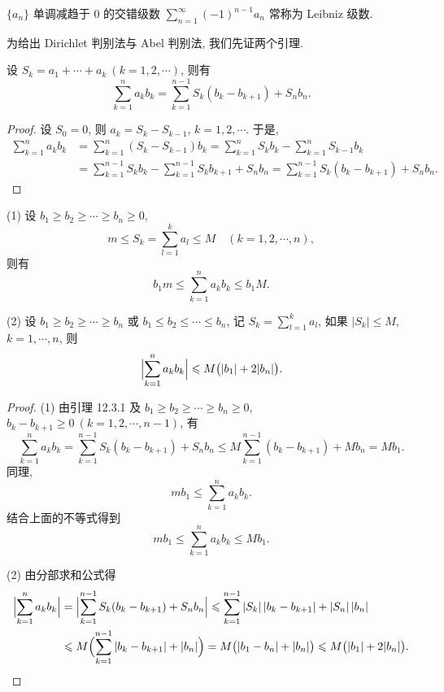 $\{a_{n}\}$ 单调减趋于 $0$ 的交错级数 $\sum_{n=1}^{\infty}(-1)^{n-1}a_{n}$ 常称为 Leibniz 级数.

为给出 Dirichlet 判别法与 Abel 判别法, 我们先证两个引理.

\begin{lemma}[分部求和法]\label{lem:12.3.1}
设 $S_{k}=a_{1}+\cdots+a_{k}\ (k=1,2,\cdots)$, 则有
\[
  \sum_{k=1}^{n}a_{k}b_{k}=\sum_{k=1}^{n-1}S_{k}(b_{k}-b_{k+1})+S_{n}b_{n}.
\]
\end{lemma}

\begin{proof}
设 $S_{0}=0$, 则 $a_{k}=S_{k}-S_{k-1}$, $k=1,2,\cdots$. 于是,
\[
\begin{aligned}
  \sum_{k=1}^{n}a_{k}b_{k}
  &=\sum_{k=1}^{n}(S_{k}-S_{k-1})b_{k}
   =\sum_{k=1}^{n}S_{k}b_{k}-\sum_{k=1}^{n}S_{k-1}b_{k}\\
  &=\sum_{k=1}^{n-1}S_{k}b_{k}-\sum_{k=1}^{n-1}S_{k}b_{k+1}+S_{n}b_{n}
   =\sum_{k=1}^{n-1}S_{k}(b_{k}-b_{k+1})+S_{n}b_{n}.
\end{aligned}
\]
\end{proof}

\begin{lemma}[Abel 引理]\label{lem:12.3.2}
(1) 设 $b_{1}\geqslant b_{2}\geqslant\cdots\geqslant b_{n}\geqslant0$,
\[
  m\leqslant S_{k}=\sum_{l=1}^{k}a_{l}\leqslant M\quad(k=1,2,\cdots,n),
\]
则有
\[
  b_{1}m\leqslant\sum_{k=1}^{n}a_{k}b_{k}\leqslant b_{1}M.
\]

(2) 设 $b_{1}\geqslant b_{2}\geqslant\cdots\geqslant b_{n}$ 或 $b_{1}\leqslant b_{2}\leqslant\cdots\leqslant b_{n}$, 记 $S_{k}=\sum_{l=1}^{k}a_{l}$, 如果 $|S_{k}|\leqslant M$, $k=1,\cdots,n$, 则
\[
  \Bigl|\sum_{k=1}^{n}a_{k}b_{k}\Bigr|\leqslant M\bigl(|b_{1}|+2|b_{n}|\bigr).
\]
\end{lemma}

\begin{proof}
(1) 由引理 12.3.1 及 $b_{1}\geqslant b_{2}\geqslant\cdots\geqslant b_{n}\geqslant0$, $b_{k}-b_{k+1}\geqslant0\ (k=1,2,\cdots,n-1)$, 有
\[
  \sum_{k=1}^{n}a_{k}b_{k}
  =\sum_{k=1}^{n-1}S_{k}(b_{k}-b_{k+1})+S_{n}b_{n}
  \leqslant M\sum_{k=1}^{n-1}(b_{k}-b_{k+1})+Mb_{n}=Mb_{1}.
\]
同理,
\[
  mb_{1}\leqslant\sum_{k=1}^{n}a_{k}b_{k}.
\]
结合上面的不等式得到
\[
  mb_{1}\leqslant\sum_{k=1}^{n}a_{k}b_{k}\leqslant Mb_{1}.
\]

(2) 由分部求和公式得
\[
\begin{aligned}
  \Bigl|\sum_{k=1}^{n}a_{k}b_{k}\Bigr|
  &=\Bigl|\sum_{k=1}^{n-1}S_{k}(b_{k}-b_{k+1})+S_{n}b_{n}\Bigr|
   \leqslant\sum_{k=1}^{n-1}|S_{k}|\,|b_{k}-b_{k+1}|+|S_{n}|\,|b_{n}|\\
  &\leqslant M\Bigl(\sum_{k=1}^{n-1}|b_{k}-b_{k+1}|+|b_{n}|\Bigr)
   =M\bigl(|b_{1}-b_{n}|+|b_{n}|\bigr)
   \leqslant M\bigl(|b_{1}|+2|b_{n}|\bigr).
\end{aligned}
\]
\end{proof}

